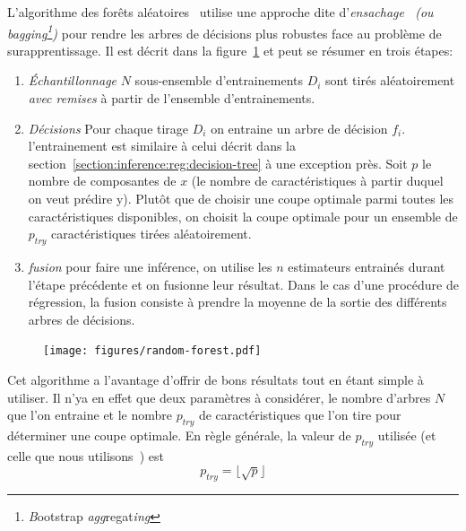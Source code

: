 L'algorithme des forêts aléatoires~\cite{breiman2001random} utilise une approche dite d'\emph{ensachage~\cite{breiman1996bagging} (ou bagging\footnote{\textit{B}ootstrap \textit{agg}regat\textit{ing}})} pour rendre les arbres de décisions plus robustes face au problème de surapprentissage.
Il est décrit dans la figure~\ref{fig:random-forest} et peut se résumer en trois étapes:
\begin{enumerate}
	\item \emph{Échantillonnage} $N$ sous-ensemble d'entrainements $D_i$ sont tirés aléatoirement \emph{avec remises} à partir de l'ensemble d'entrainements.
	\item \emph{Décisions} Pour chaque tirage $D_i$ on entraine un arbre de décision $f_i$. l'entrainement est similaire à celui décrit dans la section~\ref{section:inference:reg:decision-tree} à une exception près.
	Soit $p$ le nombre de composantes de $x$ (le nombre de caractéristiques à partir duquel on veut prédire y).
	Plutôt que de choisir une coupe optimale parmi toutes les caractéristiques disponibles, on choisit la coupe optimale pour un ensemble de $p_{try}$ caractéristiques tirées aléatoirement. 
	\item \emph{fusion} pour faire une inférence, on utilise les $n$ estimateurs entrainés durant l'étape précédente et on fusionne leur résultat. 
	Dans le cas d'une procédure de régression, la fusion consiste à prendre la moyenne de la sortie des différents arbres de décisions.
\end{enumerate}

\begin{figure}
	\centering
	\texttt{[image: figures/random-forest.pdf]}
	\caption{\label{fig:random-forest}}
\end{figure}

Cet algorithme a l'avantage d'offrir de bons résultats tout en étant simple à utiliser.
Il n'ya en effet que deux paramètres à considérer, le nombre d'arbres $N$ que l'on entraine et le nombre $p_{try}$ de caractéristiques que l'on tire pour déterminer une coupe optimale. 
En règle générale, la valeur de $p_{try}$ utilisée (et celle que nous utilisons~\cite{docrandomforest}) est 
\begin{equation}
	\label{equation:ptry}
	p_{try} = \lfloor \sqrt{p} \rfloor
\end{equation}

